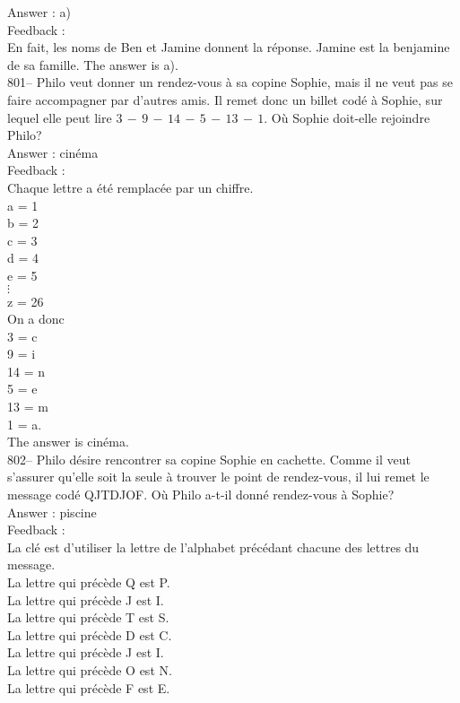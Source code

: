 ﻿\documentclass[letterpaper, 12pt]{article}
\begin{document}
Answer : a)\\

Feedback : \\
En fait, les noms de Ben et Jamine donnent la r\'eponse.  Jamine est la
benjamine de sa famille.  The answer is a).\\

801-- Philo veut donner un rendez-vous \`a sa copine Sophie, mais il ne veut
pas se faire accompagner par d'autres amis.  Il remet donc un billet cod\'e
\`a Sophie,  sur lequel elle peut lire $3\,-\,9\,-\,14\,-\,5\,-\,13\,-\,1$.
O\`u Sophie doit-elle rejoindre Philo?\\

Answer : cin\'ema\\

Feedback : \\
Chaque lettre a \'et\'e remplac\'ee par un chiffre. \\
a = 1\\
b = 2\\
c = 3\\
d = 4\\
e = 5\\
$\vdots$\\
z = 26\\

On a donc\\
3 = c\\
9 = i\\
14 = n\\
5 = e\\
13 = m\\
1 = a.\\

The answer is cin\'ema.\\

802-- Philo d\'esire rencontrer sa copine Sophie en cachette.  Comme il veut
s'assurer qu'elle soit la seule \`a trouver le point de rendez-vous, il lui
remet le message cod\'e QJTDJOF.  O\`u Philo a-t-il donn\'e rendez-vous \`a
Sophie?\\

Answer : piscine\\

Feedback : \\
La cl\'e est d'utiliser la lettre de l'alphabet pr\'ec\'edant chacune des
lettres du message.\\
La lettre qui pr\'ec\`ede Q est P.\\
La lettre qui pr\'ec\`ede J est I.\\
La lettre qui pr\'ec\`ede T est S.\\
La lettre qui pr\'ec\`ede D est C.\\
La lettre qui pr\'ec\`ede J est I.\\
La lettre qui pr\'ec\`ede O est N.\\
La lettre qui pr\'ec\`ede F est E.\\
\end{document}
